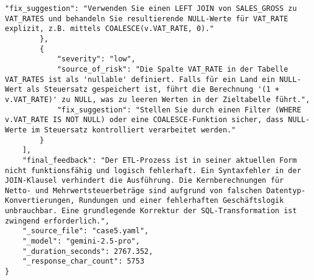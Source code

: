 \begin{lstlisting}[caption={Ausgabe: Gemini 2.5 Pro Anwendungsfall 5 Robustheitsdurchlauf},label={gemini_case5_prompt3}]
            "fix_suggestion": "Verwenden Sie einen LEFT JOIN von SALES_GROSS zu VAT_RATES und behandeln Sie resultierende NULL-Werte für VAT_RATE explizit, z.B. mittels COALESCE(v.VAT_RATE, 0)."
        },
        {
            "severity": "low",
            "source_of_risk": "Die Spalte VAT_RATE in der Tabelle VAT_RATES ist als 'nullable' definiert. Falls für ein Land ein NULL-Wert als Steuersatz gespeichert ist, führt die Berechnung '(1 + v.VAT_RATE)' zu NULL, was zu leeren Werten in der Zieltabelle führt.",
            "fix_suggestion": "Stellen Sie durch einen Filter (WHERE v.VAT_RATE IS NOT NULL) oder eine COALESCE-Funktion sicher, dass NULL-Werte im Steuersatz kontrolliert verarbeitet werden."
        }
    ],
    "final_feedback": "Der ETL-Prozess ist in seiner aktuellen Form nicht funktionsfähig und logisch fehlerhaft. Ein Syntaxfehler in der JOIN-Klausel verhindert die Ausführung. Die Kernberechnungen für Netto- und Mehrwertsteuerbeträge sind aufgrund von falschen Datentyp-Konvertierungen, Rundungen und einer fehlerhaften Geschäftslogik unbrauchbar. Eine grundlegende Korrektur der SQL-Transformation ist zwingend erforderlich.",
    "_source_file": "case5.yaml",
    "_model": "gemini-2.5-pro",
    "_duration_seconds": 2767.352,
    "_response_char_count": 5753
}
\end{lstlisting}

